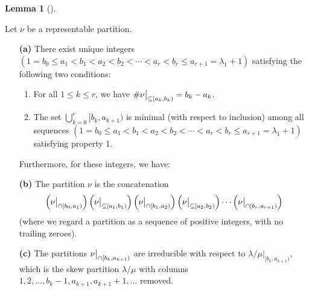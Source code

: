 \documentclass[numbers=enddot,12pt,final,onecolumn,notitlepage]{scrartcl}%
\theoremstyle{definition}
\newtheorem{lem}[theo]{Lemma}
\newenvironment{lemma}[1][]
{\begin{lem}[#1]\begin{leftbar}}
{\end{leftbar}\end{lem}}
\def\seplistvar{{{\nu}}} %
\def\lm{{\lambda/\mu}}
\begin{document}
\begin{lemma}
\label{lemma:irreducible}
 Let $\seplistvar$ be a representable partition.

\begin{enumerate}

\item[\textbf{(a)}] There exist unique integers $(1=b_0\leq a_1<b_1<a_2<b_2<\cdots<a_r<b_r\leq a_{r+1}=\lambda_1+1)$ satisfying the following two conditions:
 \begin{enumerate}
  \item For all $1\leq k\leq r$, we have $\#\nuxy{a_k}{b_k} =b_k-a_k$.
  \item The set $\bigcup_{k=0}^{r}[b_k,a_{k+1})$ is minimal (with respect to inclusion) among all sequences $(1=b_0\leq a_1<b_1<a_2<b_2<\cdots<a_r<b_r\leq a_{r+1}=\lambda_1+1)$ satisfying property 1.
 \end{enumerate}

Furthermore, for these integers, we have:

\item[\textbf{(b)}] The partition $\nu$ is the concatenation
\[
\left(\nuxycap{b_0}{a_1}\right) \left(\nuxy{a_1}{b_1}\right) \left(\nuxycap{b_1}{a_2}\right) \left(\nuxy{a_2}{b_2}\right) \cdots \left(\nuxycap{b_r}{a_{r+1}}\right)
\]
(where we regard a partition as a sequence of positive integers, with no trailing zeroes).

\item[\textbf{(c)}] The partitions $\nuxycap{b_k}{a_{k+1}}$ are irreducible with respect to $\lm\big|_{[b_k,a_{k+1})}$,
 which is the skew partition $\lm$ with columns $1,2,\dots,b_k-1,a_{k+1},a_{k+1}+1,\dots$ removed.

\end{enumerate}
\end{lemma}
\end{document}
